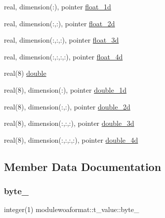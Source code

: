 \begin{DoxyCompactItemize}
\item 
real, dimension(\+:), pointer \mbox{\hyperlink{structmodulewoaformat_1_1t__value_a83a28dc7f6e1acb02d20b2d8d199a143}{float\+\_\+1d}}
\item 
real, dimension(\+:,\+:), pointer \mbox{\hyperlink{structmodulewoaformat_1_1t__value_aa44972e3aa13691cff3c768dd6e6c1b6}{float\+\_\+2d}}
\item 
real, dimension(\+:,\+:,\+:), pointer \mbox{\hyperlink{structmodulewoaformat_1_1t__value_a86d8aecffc80ad87724154f85b1521d7}{float\+\_\+3d}}
\item 
real, dimension(\+:,\+:,\+:,\+:), pointer \mbox{\hyperlink{structmodulewoaformat_1_1t__value_ae1d6e0867f65fe73a05a7f747641ffee}{float\+\_\+4d}}
\item 
real(8) \mbox{\hyperlink{structmodulewoaformat_1_1t__value_a4f77e0a48aa9543bda4f3ba3e5b07201}{double}}
\item 
real(8), dimension(\+:), pointer \mbox{\hyperlink{structmodulewoaformat_1_1t__value_a8a218f5337d1a97c5e28332a058bd85b}{double\+\_\+1d}}
\item 
real(8), dimension(\+:,\+:), pointer \mbox{\hyperlink{structmodulewoaformat_1_1t__value_a7b554b9fea98495e0fc16292997902ab}{double\+\_\+2d}}
\item 
real(8), dimension(\+:,\+:,\+:), pointer \mbox{\hyperlink{structmodulewoaformat_1_1t__value_ad44f653fe5921e7af50e7c470dad60a4}{double\+\_\+3d}}
\item 
real(8), dimension(\+:,\+:,\+:,\+:), pointer \mbox{\hyperlink{structmodulewoaformat_1_1t__value_a126d441a133b06c80b0755931f569134}{double\+\_\+4d}}
\end{DoxyCompactItemize}


\subsection{Member Data Documentation}
\mbox{\label{structmodulewoaformat_1_1t__value_ae809c64acab9bc0ccde4e90e02c57daa}} 
\subsubsection{\texorpdfstring{byte\+\_\+}{byte\_}}
{\footnotesize\ttfamily integer(1) modulewoaformat\+::t\+\_\+value\+::byte\+\_\+\hspace{0.3cm}{\ttfamily [private]}}

